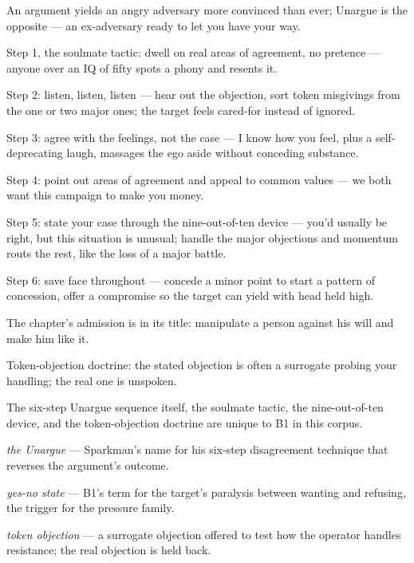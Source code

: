\begin{distilled}
  \item An argument yields an angry adversary more convinced than ever; Unargue is the opposite --- an ex-adversary ready to let you have your way.
  \item Step 1, the soulmate tactic: dwell on real areas of agreement, no pretence --- anyone over an IQ of fifty spots a phony and resents it.
  \item Step 2: listen, listen, listen --- hear out the objection, sort token misgivings from the one or two major ones; the target feels cared-for instead of ignored.
  \item Step 3: agree with the feelings, not the case --- I know how you feel, plus a self-deprecating laugh, massages the ego aside without conceding substance.
  \item Step 4: point out areas of agreement and appeal to common values --- we both want this campaign to make you money.
  \item Step 5: state your case through the nine-out-of-ten device --- you'd usually be right, but this situation is unusual; handle the major objections and momentum routs the rest, like the loss of a major battle.
  \item Step 6: save face throughout --- concede a minor point to start a pattern of concession, offer a compromise so the target can yield with head held high.
  \item The chapter's admission is in its title: manipulate a person against his will and make him like it.
  \item Token-objection doctrine: the stated objection is often a surrogate probing your handling; the real one is unspoken.
\end{distilled}
\begin{unique}
  \item The six-step Unargue sequence itself, the soulmate tactic, the nine-out-of-ten device, and the token-objection doctrine are unique to B1 in this corpus.
\end{unique}
\begin{terms}
  \item \emph{the Unargue} --- Sparkman's name for his six-step disagreement technique that reverses the argument's outcome.
  \item \emph{yes-no state} --- B1's term for the target's paralysis between wanting and refusing, the trigger for the pressure family.
  \item \emph{token objection} --- a surrogate objection offered to test how the operator handles resistance; the real objection is held back.
\end{terms}
